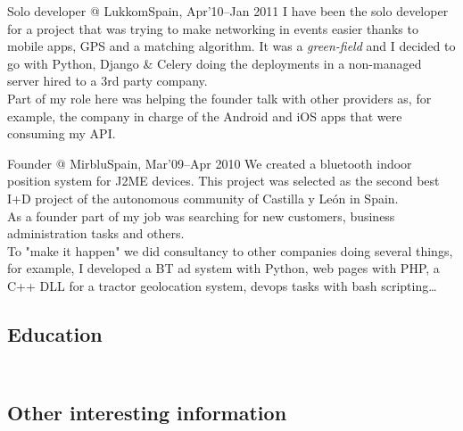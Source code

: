 \documentclass[11pt, a4paper, sans]{moderncv}
\begin{document}
\cventry{}{}
{Solo developer @ Lukkom}{Spain, Apr'10--Jan 2011}
{}{\vspace{-1em}
I have been the solo developer for a project that was trying to make networking in events easier thanks to mobile apps, GPS and a matching algorithm.
It was a \textit{green-field} and I decided to go with Python, Django \& Celery doing the deployments in a non-managed server hired to a 3rd party company.\\
Part of my role here was helping the founder talk with other providers as, for example, the company in charge of the Android and iOS apps that were consuming my API.\\}

\cventry{}{}
{Founder @ Mirblu}{Spain, Mar'09--Apr 2010}
{}{\vspace{-1em}
We created a bluetooth indoor position system for J2ME devices.
This project was selected as the second best I+D project of the autonomous community of Castilla y León in Spain.\\
As a founder part of my job was searching for new customers, business administration tasks and others.\\
To "make it happen" we did consultancy to other companies doing several things, for example, I developed a BT ad system with Python, web pages with PHP, a C++ DLL for a tractor geolocation system, devops tasks with bash scripting\ldots\\}


%
%

\subsection{Education}
\vspace{-1em}
\vspace{-1em}
\vspace{-1em}

%
%

\subsection{\\Other interesting information}
\end{document}
